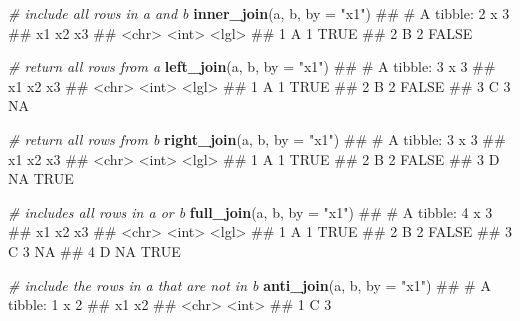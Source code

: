 \documentclass[]{book}
\newenvironment{Shaded}{\begin{snugshade}}{\end{snugshade}}
\newcommand{\KeywordTok}[1]{\textcolor[rgb]{0.13,0.29,0.53}{\textbf{#1}}}
\newcommand{\DataTypeTok}[1]{\textcolor[rgb]{0.13,0.29,0.53}{#1}}
\newcommand{\StringTok}[1]{\textcolor[rgb]{0.31,0.60,0.02}{#1}}
\newcommand{\CommentTok}[1]{\textcolor[rgb]{0.56,0.35,0.01}{\textit{#1}}}
\newcommand{\NormalTok}[1]{#1}
\begin{document}
\begin{Shaded}
\begin{Highlighting}[]
\CommentTok{# include all rows in a and b}
\KeywordTok{inner_join}\NormalTok{(a, b, }\DataTypeTok{by =} \StringTok{"x1"}\NormalTok{)}
\NormalTok{## # A tibble: 2 x 3}
\NormalTok{##   x1       x2 x3   }
\NormalTok{##   <chr> <int> <lgl>}
\NormalTok{## 1 A         1 TRUE }
\NormalTok{## 2 B         2 FALSE}
\end{Highlighting}
\end{Shaded}

\begin{Shaded}
\begin{Highlighting}[]
\CommentTok{# return all rows from a}
\KeywordTok{left_join}\NormalTok{(a, b, }\DataTypeTok{by =} \StringTok{"x1"}\NormalTok{)}
\NormalTok{## # A tibble: 3 x 3}
\NormalTok{##   x1       x2 x3   }
\NormalTok{##   <chr> <int> <lgl>}
\NormalTok{## 1 A         1 TRUE }
\NormalTok{## 2 B         2 FALSE}
\NormalTok{## 3 C         3 NA}
\end{Highlighting}
\end{Shaded}

\begin{Shaded}
\begin{Highlighting}[]
\CommentTok{# return all rows from b}
\KeywordTok{right_join}\NormalTok{(a, b, }\DataTypeTok{by =} \StringTok{"x1"}\NormalTok{)}
\NormalTok{## # A tibble: 3 x 3}
\NormalTok{##   x1       x2 x3   }
\NormalTok{##   <chr> <int> <lgl>}
\NormalTok{## 1 A         1 TRUE }
\NormalTok{## 2 B         2 FALSE}
\NormalTok{## 3 D        NA TRUE}
\end{Highlighting}
\end{Shaded}

\begin{Shaded}
\begin{Highlighting}[]
\CommentTok{# includes all rows in a or b}
\KeywordTok{full_join}\NormalTok{(a, b, }\DataTypeTok{by =} \StringTok{"x1"}\NormalTok{)}
\NormalTok{## # A tibble: 4 x 3}
\NormalTok{##   x1       x2 x3   }
\NormalTok{##   <chr> <int> <lgl>}
\NormalTok{## 1 A         1 TRUE }
\NormalTok{## 2 B         2 FALSE}
\NormalTok{## 3 C         3 NA   }
\NormalTok{## 4 D        NA TRUE}
\end{Highlighting}
\end{Shaded}

\begin{Shaded}
\begin{Highlighting}[]
\CommentTok{# include the rows in a that are not in b}
\KeywordTok{anti_join}\NormalTok{(a, b, }\DataTypeTok{by =} \StringTok{"x1"}\NormalTok{)}
\NormalTok{## # A tibble: 1 x 2}
\NormalTok{##   x1       x2}
\NormalTok{##   <chr> <int>}
\NormalTok{## 1 C         3}
\end{Highlighting}
\end{Shaded}
\end{document}
